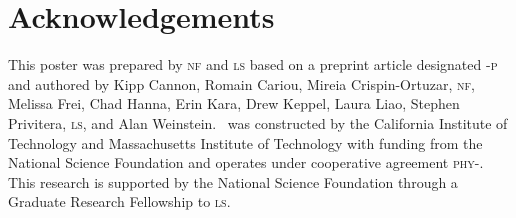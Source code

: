 \documentclass[portrait,plainboxedsections]{sciposter}
\begin{document}
\begin{minipage}[t]{0.25\textwidth}


\end{minipage}

\section*{Acknowledgements}

This poster was prepared by \textsc{nf} and \textsc{ls} based on a preprint
article designated \LIGO{}-\textsc{p} and authored by
Kipp Cannon, Romain Cariou, Mireia Crispin-Ortuzar, \textsc{nf}, Melissa Frei,
Chad Hanna, Erin Kara, Drew Keppel, Laura Liao, Stephen Privitera, \textsc{ls},
and Alan Weinstein. \LIGO\ was constructed by the California Institute of
Technology and Massachusetts Institute of Technology with funding from the
National Science Foundation and operates under cooperative agreement
\textsc{phy}-. This research is supported by the National
Science Foundation through a Graduate Research Fellowship to \textsc{ls}.




\end{document}
